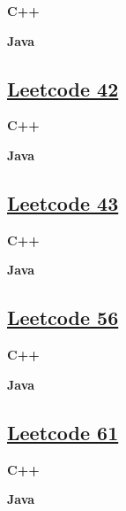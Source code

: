 \textbf{C++}\par


\textbf{Java}\par



\subsection{\href{https://leetcode-cn.com/}{Leetcode 42}}\label{app:codelist:leetcode:42}

\textbf{C++}\par


\textbf{Java}\par



\subsection{\href{https://leetcode-cn.com/}{Leetcode 43}}\label{app:codelist:leetcode:43}

\textbf{C++}\par


\textbf{Java}\par



\subsection{\href{https://leetcode-cn.com/}{Leetcode 56}}\label{app:codelist:leetcode:56}

\textbf{C++}\par


\textbf{Java}\par



\subsection{\href{https://leetcode-cn.com/}{Leetcode 61}}\label{app:codelist:leetcode:61}

\textbf{C++}\par


\textbf{Java}\par



